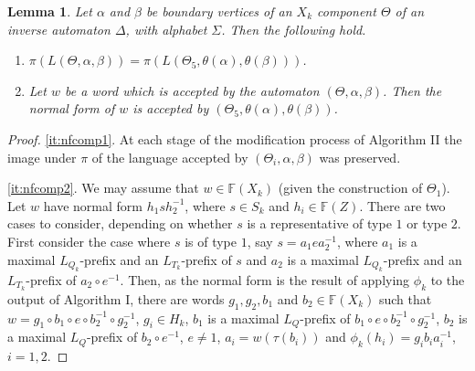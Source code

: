\documentclass[a4paper,12pt]{article}
\renewcommand{\a}{\alpha }
\renewcommand{\b}{\beta }
\newcommand{\D}{\Delta }
\newcommand{\T}{\Theta }
\renewcommand{\S}{\Sigma }
\renewcommand{\t}{\tau }
\newtheorem{lemma}[theorem]{Lemma}
\numberwithin{equation}{section}
\numberwithin{figure}{section}
\newcommand{\FF}{\ensuremath{\mathbb{F}}}
\newcommand{\be}{\begin{enumerate}}
\newcommand{\ee}{\end{enumerate}}
\begin{document}
\begin{lemma}\label{lem:nfcomp}
Let $\a$ and $\b$ be boundary vertices of  an $X_k$ component $\T$ of
an inverse automaton $\D$, with alphabet $\S$. Then   the following hold.
\be
\item\label{it:nfcomp1}
  $\pi(L(\T,\a,\b))=\pi(L(\T_5,\theta(\a),\theta(\b)))$.
\item\label{it:nfcomp2} Let $w$ be a word
 which is accepted by the automaton $(\T, \a, \b)$. Then the
normal form of $w$ is accepted by $(\T_5, \theta(\a), \theta(\b))$.
\ee
\end{lemma}
\begin{proof}
\ref{it:nfcomp1}. 
At each stage of the modification process of Algorithm
II the image under $\pi$ of the language accepted by $(\T_i,\a,\b)$  was
preserved. 

\ref{it:nfcomp2}.
We may assume that $w\in \FF(X_k)$ (given the construction of $\T_1$).
Let $w$ have normal form $h_1s h_2^{-1}$, where $s\in S_k$ and $h_i\in \FF(Z)$.
There are two cases to consider, depending on whether $s$ is a
representative of type $1$ or type $2$.
 First consider the case where $s$ is of type $1$, say
 $s= a_1 e a_2^{-1}$, where
$a_1$ is a maximal $L_{Q_k}$-prefix and an $L_{T_k}$-prefix of $s$ and
 $a_2$  is a maximal $L_{Q_k}$-prefix and an $L_{T_k}$-prefix of $a_2\circ e^{-1}$.
 Then, as the normal form is the result of applying $\phi_k$ to the 
output of Algorithm I, 
 there are words
$g_1, g_2, b_1$ and $b_2\in \FF(X_k)$ such that
$w=g_1\circ b_1\circ e \circ b_2^{-1}\circ g_2^{-1}$,
$g_i\in H_k$, $b_1$ is a maximal $L_Q$-prefix of
$b_1\circ e \circ b_2^{-1}\circ g_2^{-1}$,
$b_2$ is a maximal $L_Q$-prefix of $b_2\circ e^{-1}$, $e\neq 1$,
$a_i=w(\t(b_i))$ and $\phi_k(h_i)=g_ib_ia_i^{-1}$, $i=1,2$.


\end{proof}
\end{document}
